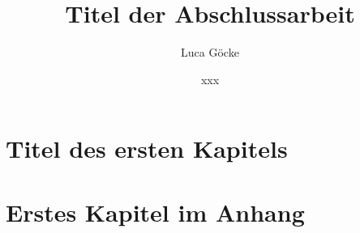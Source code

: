 \documentclass[pstricks,siunitx,addfonts,theorem,font=palatino,british]{tumphthesis}
\title{Titel der Abschlussarbeit}
\author{Luca Göcke}
\date{xxx}
\begin{document}

\frontmatter
\maketitle
\tableofcontents


\mainmatter
\chapter{Titel des ersten Kapitels}








\appendix
\chapter{Erstes Kapitel im Anhang}

\backmatter
\printbibliography
\end{document}
